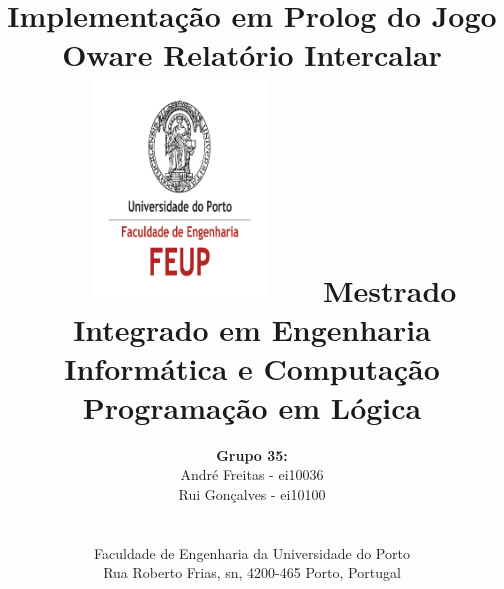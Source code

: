 \documentclass[15pt,a4paper]{article}
\begin{document}
\setlength{\textwidth}{16cm}
\setlength{\textheight}{22cm}

\title{\Huge\textbf{Implementação em Prolog do Jogo Oware}\linebreak\linebreak\linebreak
\Large\textbf{Relatório Intercalar}\linebreak\linebreak
\includegraphics[height=6cm, width=7cm]{feup.pdf}\linebreak \linebreak
\Large{Mestrado Integrado em Engenharia Informática e Computação} \linebreak \linebreak
\Large{Programação em Lógica}\linebreak
}

\author{\textbf{Grupo 35:}\\ André Freitas - ei10036 \\ Rui Gonçalves - ei10100 \\\linebreak\linebreak \\
 \\ Faculdade de Engenharia da Universidade do Porto \\ Rua Roberto Frias, s\/n, 4200-465 Porto, Portugal \linebreak\linebreak\linebreak
\linebreak\linebreak\vspace{1cm}}
\maketitle
\thispagestyle{empty}

\end{document}
